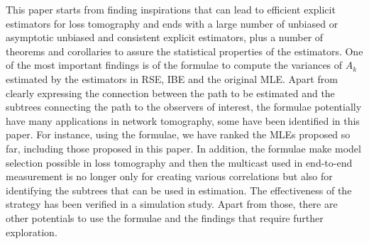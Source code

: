\documentclass[10pt,onecolumn]{IEEEtran}
\begin{document}
This paper starts from finding inspirations that can lead to efficient explicit estimators for loss tomography and ends with a large number of unbiased or asymptotic unbiased and consistent explicit estimators, plus a number of theorems and corollaries to assure the statistical properties of the estimators. One of the most important findings is of the formulae to compute the variances of $A_k$ estimated by the estimators in RSE, IBE and the original MLE. Apart from clearly expressing the connection between the path to be estimated and the subtrees connecting the path to the observers of interest, the formulae potentially have many applications in network tomography, some have been identified in this paper.  For instance, using the formulae, we have ranked the MLEs proposed so far, including those proposed  in this paper. In addition, the formulae make model selection possible in loss tomography and then the multicast used in end-to-end measurement is no longer only for creating various correlations but also for identifying the subtrees that can be used in estimation. The effectiveness of the strategy has been verified in a simulation study. Apart from those, there are other potentials to use the formulae and the findings that require further exploration.






\end{document}
